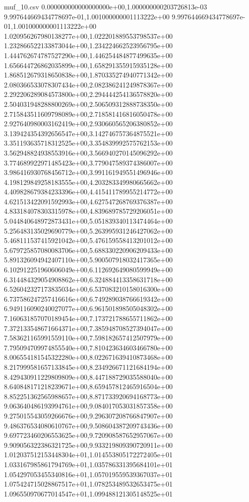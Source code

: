 \begin{filecontents*}{muf_10.csv}
0.000000000000000000e+00,1.000000000203726813e-03
9.997644669434778697e-01,1.001000000001113222e+00
9.997644669434778697e-01,1.001000000001113222e+00
1.020956267980138277e+00,1.022201889553798537e+00
1.232866522133873044e+00,1.234224662523956795e+00
1.444762674787527290e+00,1.446254484877499635e+00
1.656644726862035899e+00,1.658291355915935128e+00
1.868512679318650838e+00,1.870335274940771342e+00
2.080366533078307434e+00,2.082386241249878367e+00
2.292206289084573800e+00,2.294444254136578820e+00
2.504031948288800269e+00,2.506509312888738350e+00
2.715843511609798089e+00,2.718581416816050478e+00
2.927640980003162419e+00,2.930660565206380852e+00
3.139424354392656547e+00,3.142746757364875521e+00
3.351193635718312525e+00,3.354839992575762153e+00
3.562948824938553916e+00,3.566940270145096292e+00
3.774689922971485423e+00,3.779047589374386007e+00
3.986416930768456712e+00,3.991161949551496946e+00
4.198129849258183555e+00,4.203283349980665662e+00
4.409828679384233396e+00,4.415411789955214772e+00
4.621513422091592993e+00,4.627547268769376387e+00
4.833184078303315978e+00,4.839689785729206051e+00
5.044840648972873431e+00,5.051839340113474464e+00
5.256483135029690779e+00,5.263995931246427062e+00
5.468111537415921042e+00,5.476159558413201012e+00
5.679725857080083706e+00,5.688330220906209433e+00
5.891326094942407110e+00,5.900507918032417365e+00
6.102912251960606049e+00,6.112692649080599949e+00
6.314484329054908862e+00,6.324884413358631718e+00
6.526042327173835034e+00,6.537083210158016300e+00
6.737586247257416616e+00,6.749289038766619342e+00
6.949116090240027077e+00,6.961501898505048302e+00
7.160631857070189454e+00,7.173721788655711862e+00
7.372133548671664371e+00,7.385948708527394047e+00
7.583621165991559110e+00,7.598182657412507979e+00
7.795094709974855540e+00,7.810423634603466780e+00
8.006554181545322280e+00,8.022671639410873468e+00
8.217999581657133845e+00,8.234926671121684194e+00
8.429430911229809809e+00,8.447188729035588040e+00
8.640848171218239671e+00,8.659457812465916504e+00
8.852251362565988657e+00,8.871733920694168773e+00
9.063640486193994761e+00,9.084017053031857358e+00
9.275015543059266676e+00,9.296307208766847907e+00
9.486376534080610767e+00,9.508604387209743436e+00
9.697723460206553625e+00,9.720908587652957067e+00
9.909056322386321725e+00,9.933219809390720911e+00
1.012037512153448304e+01,1.014553805172272405e+01
1.033167985861794769e+01,1.035786331395684101e+01
1.054297053455340816e+01,1.057019559539367037e+01
1.075424715028867517e+01,1.078253489532653475e+01
1.096550970677014547e+01,1.099488121305148525e+01

\end{filecontents*}
